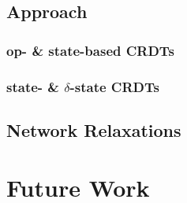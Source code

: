 \documentclass{thesis}
\begin{document}
  \section{Approach}
  \subsection{op- \& state-based CRDTs}
  \subsection{state- \& $\delta$-state CRDTs}
  \section{Network Relaxations}

  

  \chapter{Future Work}

  \newpage
  
\end{document}
